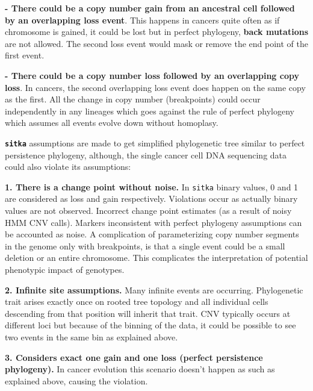 \textbf{- There could be a copy number gain from an ancestral cell followed  by an overlapping loss event}. This happens in cancers quite often as if chromosome is gained, it could be lost but in perfect phylogeny, \textbf{back mutations} are not allowed. The second loss event would mask or remove the end point of the first event.

\textbf{- There could be a copy number loss followed by an overlapping copy loss}. In cancers, the second overlapping loss event does happen on the same copy as the first. 
All the change in copy number (breakpoints) could occur independently in any lineages which goes against the rule of perfect phylogeny which assumes all events evolve down without homoplasy.  

 \textbf{\texttt{sitka}} assumptions are made to get simplified phylogenetic tree similar to perfect persistence phylogeny, although, the single cancer cell DNA sequencing data could also violate its assumptions:

\textbf{1. There is a change point without noise.} In \texttt{sitka} binary values, 0 and 1 are considered as loss and gain respectively. Violations occur as actually binary values are not observed. Incorrect change point estimates (as a result of noisy HMM CNV calls). 
Markers inconsistent with perfect phylogeny assumptions can be accounted as noise. A complication of parameterizing copy number segments in the genome only with breakpoints, is that a single event could be a small deletion or an entire chromosome. This complicates the interpretation of potential phenotypic impact of genotypes. 


\textbf{2. Infinite site assumptions.} Many infinite events are occurring. Phylogenetic trait arises exactly once on rooted tree topology and all individual cells descending from that position will inherit that trait.
CNV typically occurs at different loci but because of the binning of the data, it could be possible to see two events in the same bin as explained above.

\textbf{3. Considers exact one gain and one loss (perfect persistence phylogeny).} In cancer evolution this scenario doesn't happen as such as explained above, causing the violation.



 
 
 

